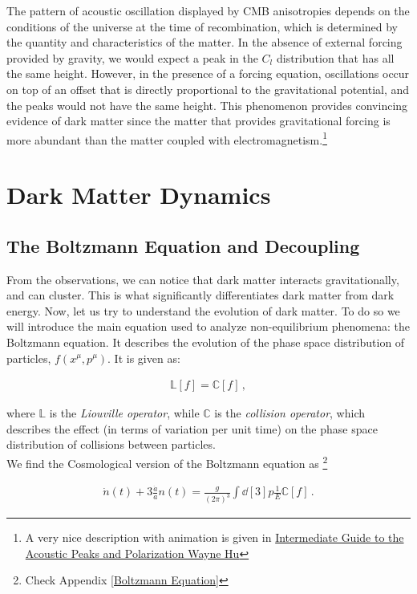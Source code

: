 The pattern of acoustic oscillation displayed by CMB anisotropies depends on the conditions of the universe at the time of recombination, which is determined by the quantity and characteristics of the matter. In the absence of external forcing provided by gravity, we would expect a peak in the $C_l$ distribution that has all the same height. However, in the presence of a forcing equation, oscillations occur on top of an offset that is directly proportional to the gravitational potential, and the peaks would not have the same height. This phenomenon provides convincing evidence of dark matter since the matter that provides gravitational forcing is more abundant than the matter coupled with electromagnetism.\footnote{ A very nice description with animation is given in \href{http://background.uchicago.edu/~whu/intermediate/driving2.htmll}{Intermediate Guide to the Acoustic Peaks and Polarization
Wayne Hu}}

\section{Dark Matter Dynamics}
\subsection{The Boltzmann Equation and Decoupling}


\hspace{0.5cm}From the observations, we can notice that dark matter interacts gravitationally, and can cluster. This is what significantly differentiates dark matter from dark energy. Now, let us try to understand the evolution of dark matter. To do so we will introduce the main equation used to analyze non-equilibrium phenomena: the Boltzmann equation. It describes the evolution of the phase space distribution of particles, \(f(x^{\mu},p^{\mu})\). It is given as:

\begin{align}
    \mathds{L} [f] = \mathds{C} [f]\,,
\end{align}

where \(\mathds{L}\) is the \emph{Liouville operator},  while \(\mathds{C}\) is the \emph{collision operator}, which describes the effect (in terms of variation per unit time) on the phase space distribution of collisions between particles. \\
We find the Cosmological version of the Boltzmann equation as \footnote{Check Appendix \ref{Boltzmann Equation}}

\begin{align}
  \dot{n}(t)
  + 3 \frac{\dot{a}}{a} n(t) = \frac{g}{(2 \pi )^3} \int \dd[3]{p} \frac{1}{E} {\mathbb{C}} [f]
\,.
\end{align}

